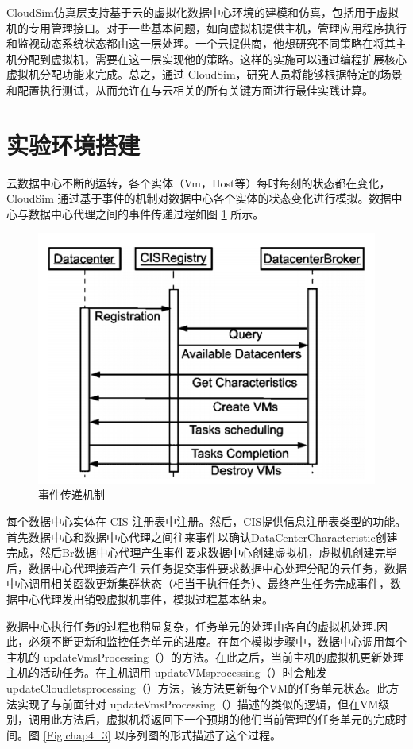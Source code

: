  CloudSim仿真层支持基于云的虚拟化数据中心环境的建模和仿真，包括用于虚拟机的专用管理接口。对于一些基本问题，如向虚拟机提供主机，管理应用程序执行和监视动态系统状态都由这一层处理。一个云提供商，他想研究不同策略在将其主机分配到虚拟机，需要在这一层实现他的策略。这样的实施可以通过编程扩展核心虚拟机分配功能来完成。总之，通过 CloudSim，研究人员将能够根据特定的场景和配置执行测试，从而允许在与云相关的所有关键方面进行最佳实践计算。

 \section{实验环境搭建}
云数据中心不断的运转，各个实体（Vm，Host等）每时每刻的状态都在变化，CloudSim 通过基于事件的机制对数据中心各个实体的状态变化进行模拟。数据中心与数据中心代理之间的事件传递过程如图 \ref{Fig:chap4_2} 所示。

\begin{figure}[htb]
  \centering
  \includegraphics{./Figure/IMG_Chap4_2.png}
  \caption{事件传递机制}\label{Fig:chap4_2}
\end{figure}

每个数据中心实体在 CIS 注册表中注册。然后，CIS提供信息注册表类型的功能。首先数据中心和数据中心代理之间往来事件以确认DataCenterCharacteristic创建完成，然后Br数据中心代理产生事件要求数据中心创建虚拟机，虚拟机创建完毕后，数据中心代理接着产生云任务提交事件要求数据中心处理分配的云任务，数据中心调用相关函数更新集群状态（相当于执行任务）、最终产生任务完成事件，数据中心代理发出销毁虚拟机事件，模拟过程基本结束。

数据中心执行任务的过程也稍显复杂，任务单元的处理由各自的虚拟机处理.因此，必须不断更新和监控任务单元的进度。在每个模拟步骤中，数据中心调用每个主机的 updateVmsProcessing（）的方法。在此之后，当前主机的虚拟机更新处理主机的活动任务。在主机调用 updateVMsprocessing（）时会触发 updateCloudletsprocessing（）方法，该方法更新每个VM的任务单元状态。此方法实现了与前面针对 updateVmsProcessing（）描述的类似的逻辑，但在VM级别，调用此方法后，虚拟机将返回下一个预期的他们当前管理的任务单元的完成时间。图 \ref{Fig:chap4_3} 以序列图的形式描述了这个过程。

